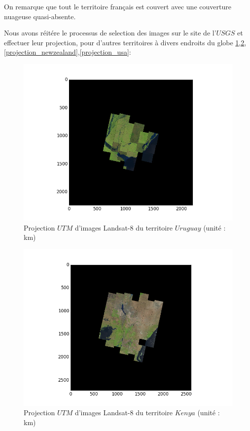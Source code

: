 \documentclass{book}
\begin{document}
On remarque que tout le territoire français est couvert avec une couverture nuageuse quasi-absente.

\clearpage

Nous avons réitére le processus de selection des images sur le site de l'$USGS$ et effectuer leur projection,
pour d'autres territoires à divers endroits du globe \ref{projection_uruguay},\ref{projection_kenya},\ref{projection_newzealand},\ref{projection_usa}:
\begin{figure}[H]
\begin{center}
\includegraphics[scale=0.8]{images/projection_uruguay.png}
\end{center}
\caption{Projection $UTM$ d'images Landsat-8 du territoire $Uruguay$ (unité : km)}
\label{projection_uruguay}
\end{figure}
\begin{figure}[H]
\begin{center}
\includegraphics[scale=0.8]{images/projection_kenya.png}
\end{center}
\caption{Projection $UTM$ d'images Landsat-8 du territoire $Kenya$ (unité : km)}
\label{projection_kenya}
\end{figure}
\end{document}
